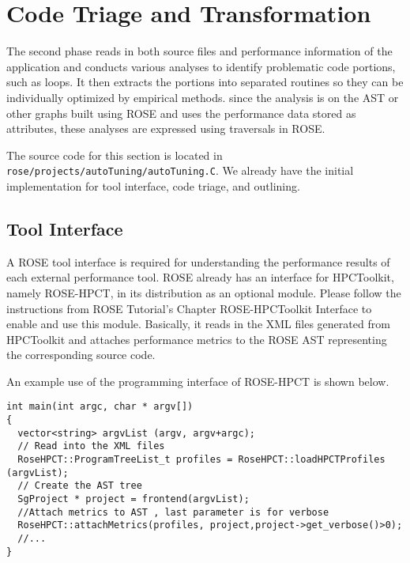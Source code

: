 \section{Code Triage and Transformation}
The second phase reads in both source files and performance information of the application
and conducts various analyses to identify problematic code portions, such as loops. 
It then extracts the portions into separated routines so they can be individually
optimized by empirical methods.  since the analysis is on the AST or other graphs built
using ROSE and uses the performance data stored as attributes, these analyses are
expressed using traversals in ROSE.

The source code for this section is located in
\lstinline{rose/projects/autoTuning/autoTuning.C}. 
We already have the initial implementation for tool interface, code triage, and
outlining. 
\subsection{Tool Interface}
A ROSE tool interface is required for understanding the performance results of each
external performance tool. ROSE already has an interface for HPCToolkit, namely ROSE-HPCT,
in its distribution as an optional module.  Please follow the instructions from ROSE
Tutorial's Chapter ROSE-HPCToolkit Interface to enable and use this module. Basically, it
reads in the XML files generated from HPCToolkit and attaches performance metrics to
the ROSE AST representing the corresponding source code. 

An example use of the programming interface of ROSE-HPCT is shown below.
{\mySmallFontSize
\begin{verbatim}
int main(int argc, char * argv[]) 
{
  vector<string> argvList (argv, argv+argc);
  // Read into the XML files
  RoseHPCT::ProgramTreeList_t profiles = RoseHPCT::loadHPCTProfiles (argvList);
  // Create the AST tree
  SgProject * project = frontend(argvList);
  //Attach metrics to AST , last parameter is for verbose
  RoseHPCT::attachMetrics(profiles, project,project->get_verbose()>0);
  //...
}
\end{verbatim}
}

